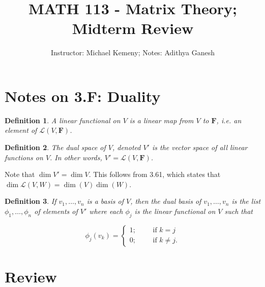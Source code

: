 \documentclass[12pt]{article}
\title{MATH 113 - Matrix Theory; Midterm Review}
\author{Instructor: Michael Kemeny; Notes: Adithya Ganesh}
\newtheorem*{definition}{Definition}
\newcommand{\mbf}{\mathbf}
\begin{document}
\maketitle
\tableofcontents


\section{Notes on 3.F: Duality}

\begin{definition}
  A linear functional on $V$ is a linear map from $V$ to $\mbf{F}$, i.e. an element of $\mathcal{L}(V, \mbf{F})$. \\
\end{definition}

\begin{definition}
  The dual space of $V$, denoted $V'$ is the vector space of all linear functions on $V$.  In other words, $V' = \mathcal{L}(V, \mbf{F})$.
\end{definition}

Note that $\dim V' = \dim V$.  This follows from 3.61, which states that  $\dim \mathcal{L}(V, W) = \dim (V) \dim(W)$.

\begin{definition}
  If $v_1, \dots, v_n$ is a basis of $V$, then the dual basis of $v_1, \dots, v_n$ is the list $\phi_1, \dots, \phi_n$ of elements of $V'$ where each $\phi_j$ is the linear functional on $V$ such that

  \[
    \phi_j(v_k) =
    \begin{cases}
      1; \qquad \text{ if } k = j \\
      0; \qquad \text{ if } k \neq j.
    \end{cases}
    \]
\end{definition}

%

\section{Review}
\end{document}
